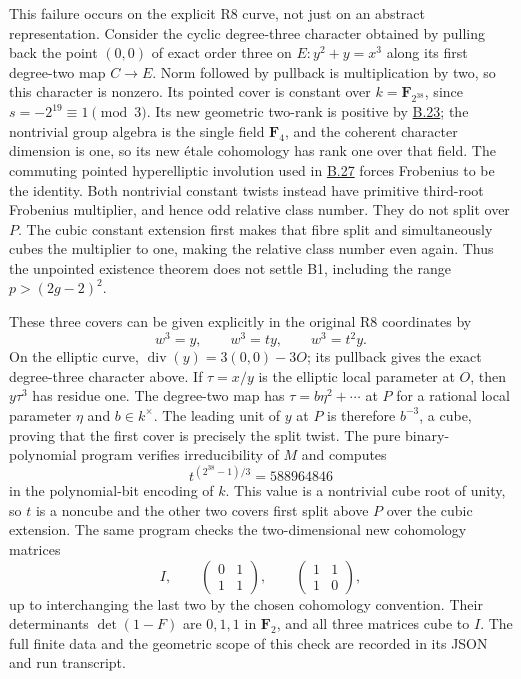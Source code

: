 \documentclass[11pt,a4paper]{article}
\newcommand{\statementref}[1]{\hyperlink{#1}{#1}}
\begin{document}
This failure occurs on the explicit R8 curve, not just on an
abstract representation. Consider the cyclic degree-three
character obtained by pulling back the point $(0,0)$ of exact
order three on $E:y^2+y=x^3$ along its first degree-two map
$C\to E$. Norm followed by pullback is multiplication by two,
so this character is nonzero. Its pointed cover is constant over
$k=\mathbf F_{2^{38}}$, since $s=-2^{19}\equiv1\pmod3$.
Its new geometric two-rank is positive by \statementref{B.23};
the nontrivial group algebra is the single field $\mathbf F_4$,
and the coherent character dimension is one, so its new
\'etale cohomology has rank one over that field. The commuting
pointed hyperelliptic involution used in \statementref{B.27}
forces Frobenius to be the identity. Both nontrivial constant
twists instead have primitive third-root Frobenius multiplier,
and hence odd relative class number. They do not split over $P$.
The cubic constant extension first makes that fibre split and
simultaneously cubes the multiplier to one, making the relative
class number even again. Thus the unpointed existence theorem
does not settle B1, including the range $p>(2g-2)^2$.

These three covers can be given explicitly in the original R8
coordinates by
\[
       w^3=y,\qquad w^3=ty,\qquad w^3=t^2y.
\]
On the elliptic curve, $\operatorname{div}(y)=3(0,0)-3O$;
its pullback gives the exact degree-three character above.
If $\tau=x/y$ is the elliptic local parameter at $O$, then
$y\tau^3$ has residue one. The degree-two map has
$\tau=b\eta^2+\cdots$ at $P$ for a rational local parameter
$\eta$ and $b\in k^\times$. The leading unit of $y$ at $P$
is therefore $b^{-3}$, a cube, proving that the first cover
is precisely the split twist.
The pure binary-polynomial program
 verifies irreducibility
of $M$ and computes
\[
        t^{(2^{38}-1)/3}=588964846
\]
in the polynomial-bit encoding of $k$. This value is a nontrivial
cube root of unity, so $t$ is a noncube and the other two covers
first split above $P$ over the cubic extension. The same program
checks the two-dimensional new cohomology matrices
\[
 I,\qquad
 \begin{pmatrix}0&1\\1&1\end{pmatrix},\qquad
 \begin{pmatrix}1&1\\1&0\end{pmatrix},
\]
up to interchanging the last two by the chosen cohomology
convention. Their determinants $\det(1-F)$ are $0,1,1$ in
$\mathbf F_2$, and all three matrices cube to $I$.
The full finite data and the geometric scope of this check are
recorded in its JSON and run transcript.
\end{document}
